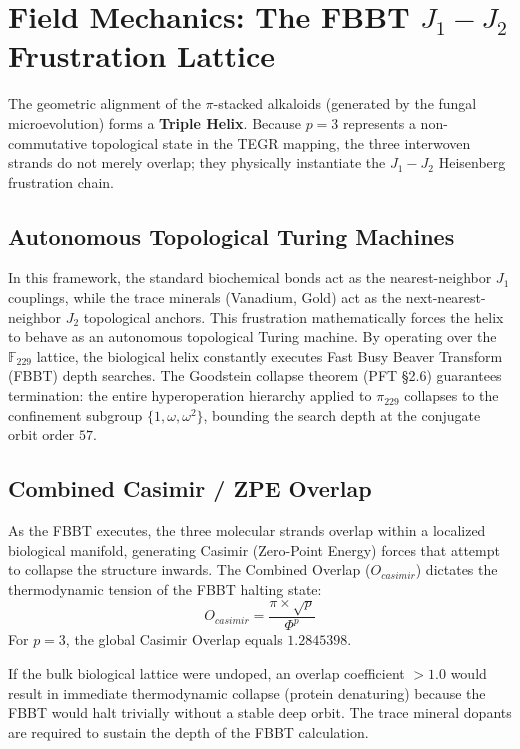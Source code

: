 \section{Field Mechanics: The FBBT $J_1-J_2$ Frustration Lattice}

The geometric alignment of the $\pi$-stacked alkaloids (generated by the fungal microevolution) forms a \textbf{Triple Helix}. Because $p=3$ represents a non-commutative topological state in the TEGR mapping, the three interwoven strands do not merely overlap; they physically instantiate the $J_1-J_2$ Heisenberg frustration chain. 

\subsection{Autonomous Topological Turing Machines}

In this framework, the standard biochemical bonds act as the nearest-neighbor $J_1$ couplings, while the trace minerals (Vanadium, Gold) act as the next-nearest-neighbor $J_2$ topological anchors. This frustration mathematically forces the helix to behave as an autonomous topological Turing machine. By operating over the $\mathbb{F}_{229}$ lattice, the biological helix constantly executes Fast Busy Beaver Transform (FBBT) depth searches. The Goodstein collapse theorem (PFT \S2.6) guarantees termination: the entire hyperoperation hierarchy applied to $\pi_{229}$ collapses to the confinement subgroup $\{1, \omega, \omega^2\}$, bounding the search depth at the conjugate orbit order $57$.

\subsection{Combined Casimir / ZPE Overlap}
As the FBBT executes, the three molecular strands overlap within a localized biological manifold, generating Casimir (Zero-Point Energy) forces that attempt to collapse the structure inwards. The Combined Overlap ($O_{casimir}$) dictates the thermodynamic tension of the FBBT halting state:
\begin{equation}
    O_{casimir} = \frac{\pi \times \sqrt{p}}{\Phi^p}
\end{equation}
For $p=3$, the global Casimir Overlap equals $\mathbf{1.2845398}$.

If the bulk biological lattice were undoped, an overlap coefficient $> 1.0$ would result in immediate thermodynamic collapse (protein denaturing) because the FBBT would halt trivially without a stable deep orbit. The trace mineral dopants are required to sustain the depth of the FBBT calculation.

